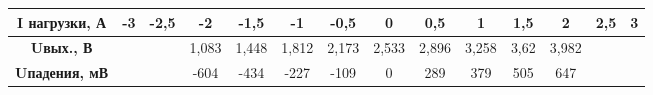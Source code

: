 \begin{table}[H]
\begin{turn}{90}
\begin{tabular}{|c|c|c|c|c|c|c|c|c|c|c|c|c|c|}
      \hline
      \textbf{I нагрузки, А} & -3    & -2,5  & -2    & -1,5  & -1    & -0,5  & 0     & 0,5   & 1     & 1,5   & 2     & 2,5   & 3 \bigstrut\\
      \hline
      \textbf{Uвых., В} &       &       & 1,083 & 1,448 & 1,812 & 2,173 & 2,533 & 2,896 & 3,258 & 3,62  & 3,982 &       &  \bigstrut\\
      \hline
      \textbf{Uпадения, мВ} &       &       & -604  & -434  & -227  & -109  & 0     & 289   & 379   & 505   & 647   &       &  \bigstrut\\
      \hline
      \end{tabular}%
      \label{tab:I_meas_LM7705}%
    \end{turn}
  \end{table}

